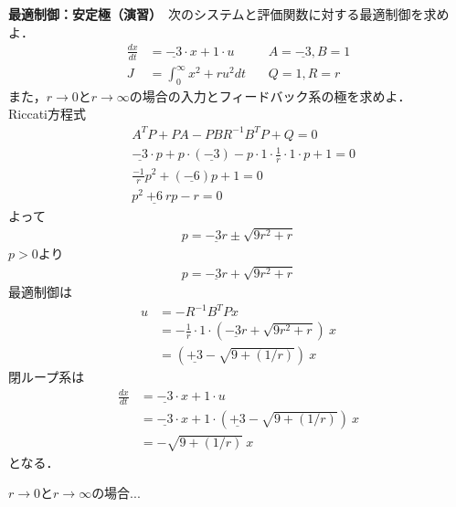 \newpage

\noindent
{\bf 最適制御：安定極（演習）}　次のシステムと評価関数に対する最適制御を求めよ．
\begin{align*}
	\frac{dx}{dt} & =\underline{-3} \cdot x + 1 \cdot u \ \ \ \ \ \ \ \ \ \ \ \ A=\underline{-3},B=1\\
	J & = \int_0^{\infty} x^2 + r u^2 dt \ \ \ \ \ \ \ \ Q=1,R=r
\end{align*}
また，$r\rightarrow 0$と$r\rightarrow \infty$の場合の入力とフィードバック系の極を求めよ．
\\

Riccati方程式
\begin{align*}
	& A^T P + P A - P B R^{-1} B^T P + Q = 0 \\
	& \underline{-3} \cdot p + p \cdot(\underline{-3}) - p \cdot 1 \cdot \frac{1}{r} \cdot 1 \cdot p + 1 = 0 \\
	& \frac{-1}{r} p^2 +(\underline{-6}) p + 1 = 0 \\
	& p^2 \  \underline{+6} \ rp - r = 0
\end{align*}
よって
\begin{align*}
	p = \underline{-3 r} \pm \sqrt{9 r^2 + r}
\end{align*}
$p>0$より
\begin{align*}
	p = \underline{-3 r} + \sqrt{9 r^2+r}
\end{align*}
最適制御は
\begin{align*}
	u &= -R^{-1}B^T P x \\
	&= -\frac{1}{r} \cdot 1 \cdot (\underline{-3 r} + \sqrt{9 r^2+r}) \  x \\
	&= (\underline{+3} - \sqrt{9 + (1/r)}) \ x
\end{align*}
閉ループ系は
\begin{align*}
	\frac{dx}{dt} & = \underline{-3} \cdot x + 1 \cdot u \\
	&= \underline{-3} \cdot x + 1 \cdot (\underline{+3} - \sqrt{9 + (1/r)}) \  x \\
	&= - \sqrt{9 + (1/r)} \ x
\end{align*}
となる．

$r\rightarrow 0$と$r\rightarrow \infty$の場合...

